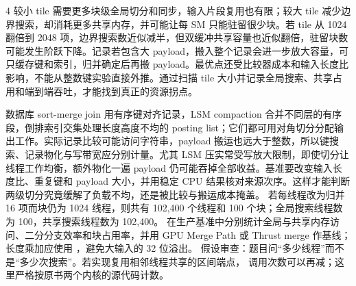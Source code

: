 \begin{solutionexercise}{4}
较小 tile 需要更多块级全局切分和同步，输入片段复用也有限；较大 tile 减少边界搜索，却消耗更多共享内存，并可能让每 SM 只能驻留很少块。若 tile 从 1024 翻倍到 2048 项，边界搜索数近似减半，但双缓冲共享容量也近似翻倍，驻留块数可能发生阶跃下降。记录若包含大 payload，搬入整个记录会进一步放大容量，可只缓存键和索引，归并确定后再搬 payload。最优点还受比较器成本和输入长度比影响，不能从整数键实验直接外推。通过扫描 tile 大小并记录全局搜索、共享占用和端到端吞吐，才能找到真正的资源拐点。

数据库 sort-merge join 用有序键对齐记录，LSM compaction 合并不同层的有序段，倒排索引交集处理长度高度不均的 posting list；它们都可用对角切分分配输出工作。实际记录比较可能访问字符串，payload 搬运也远大于整数，所以键搜索、记录物化与写带宽应分别计量。尤其 LSM 压实常受写放大限制，即使切分让线程工作均衡，额外物化一遍 payload 仍可能吞掉全部收益。基准要改变输入长度比、重复键和 payload 大小，并用稳定 CPU 结果核对来源次序。这样才能判断两级切分究竟缓解了负载不均，还是被比较与搬运成本掩盖。
\variantheading 若每线程改为归并 16 项而块仍为 1024 线程，则共有 102,400 个线程和
100 个块；全局搜索线程数为 100，共享搜索线程数为 102,400。
\practiceheading 在生产基准中分别统计全局与共享内存访问、二分分支效率和块占用率，并用
GPU Merge Path 或 Thrust merge 作基线；长度乘加应使用 ，避免大输入的 32 位溢出。
假设审查：题目问“多少线程”而不是“多少次搜索”。若实现复用相邻线程共享的区间端点，
调用次数可以再减；这里严格按原书两个内核的源代码计数。
\end{solutionexercise}
